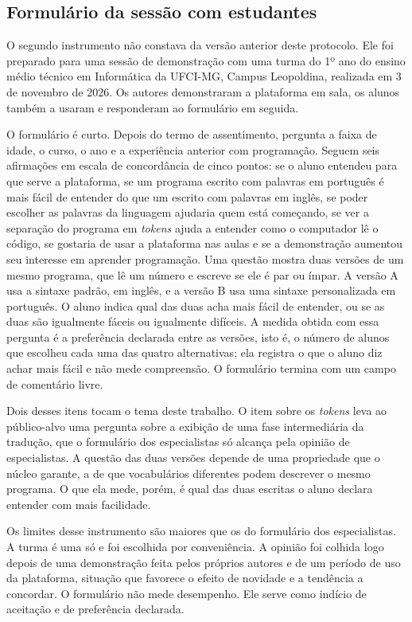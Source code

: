 \subsection{Formulário da sessão com estudantes}
\label{subsec:formulario-estudantes}

O segundo instrumento não constava da versão anterior deste protocolo. Ele foi preparado para uma sessão de demonstração com uma turma do 1º ano do ensino médio técnico em Informática da UFCI-MG, Campus Leopoldina, realizada em 3 de novembro de 2026. Os autores demonstraram a plataforma em sala, os alunos também a usaram e responderam ao formulário em seguida.

O formulário é curto. Depois do termo de assentimento, pergunta a faixa de idade, o curso, o ano e a experiência anterior com programação. Seguem seis afirmações em escala de concordância de cinco pontos: se o aluno entendeu para que serve a plataforma, se um programa escrito com palavras em português é mais fácil de entender do que um escrito com palavras em inglês, se poder escolher as palavras da linguagem ajudaria quem está começando, se ver a separação do programa em \textit{tokens} ajuda a entender como o computador lê o código, se gostaria de usar a plataforma nas aulas e se a demonstração aumentou seu interesse em aprender programação. Uma questão mostra duas versões de um mesmo programa, que lê um número e escreve se ele é par ou ímpar. A versão A usa a sintaxe padrão, em inglês, e a versão B usa uma sintaxe personalizada em português. O aluno indica qual das duas acha mais fácil de entender, ou se as duas são igualmente fáceis ou igualmente difíceis. A medida obtida com essa pergunta é a preferência declarada entre as versões, isto é, o número de alunos que escolheu cada uma das quatro alternativas; ela registra o que o aluno diz achar mais fácil e não mede compreensão. O formulário termina com um campo de comentário livre.

Dois desses itens tocam o tema deste trabalho. O item sobre os \textit{tokens} leva ao público-alvo uma pergunta sobre a exibição de uma fase intermediária da tradução, que o formulário dos especialistas só alcança pela opinião de especialistas. A questão das duas versões depende de uma propriedade que o núcleo garante, a de que vocabulários diferentes podem descrever o mesmo programa. O que ela mede, porém, é qual das duas escritas o aluno declara entender com mais facilidade.

Os limites desse instrumento são maiores que os do formulário dos especialistas. A turma é uma só e foi escolhida por conveniência. A opinião foi colhida logo depois de uma demonstração feita pelos próprios autores e de um período de uso da plataforma, situação que favorece o efeito de novidade e a tendência a concordar. O formulário não mede desempenho. Ele serve como indício de aceitação e de preferência declarada.

